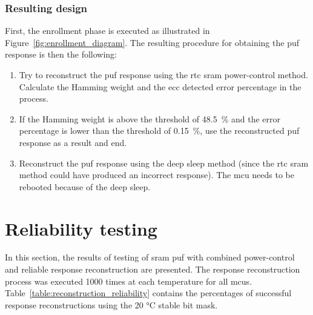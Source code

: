 \subsubsection*{Resulting design}

First, the enrollment phase is executed as illustrated in Figure~\ref{fig:enrollment_diagram}. The resulting procedure for obtaining the \gls{puf} response is then the following:
\begin{enumerate}
    \item Try to reconstruct the \gls{puf} response using the \gls{rtc} \gls{sram} power-control method. Calculate the Hamming weight and the \gls{ecc} detected error percentage in the process.
    \item If the Hamming weight is above the threshold of 48.5~\% and the error percentage is lower than the threshold of 0.15~\%, use the reconstructed \gls{puf} response as a result and end.
    \item Reconstruct the \gls{puf} response using the deep sleep method (since the \gls{rtc} \gls{sram} method could have produced an incorrect response). The \gls{mcu} needs to be rebooted because of the deep sleep.
\end{enumerate}

\section{Reliability testing}\label{sec:testing}

In this section, the results of testing of \gls{sram} \gls{puf} with combined power-control and reliable response reconstruction are presented. The response reconstruction process was executed 1000 times at each temperature for all \glspl{mcu}. Table~\ref{table:reconstruction_reliability} contains the percentages of successful response reconstructions using the 20 °C stable bit mask.

